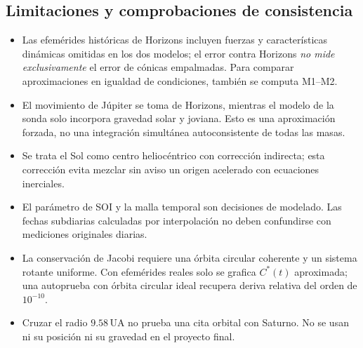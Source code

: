 \documentclass[11pt,a4paper]{article}
\begin{document}
\subsection{Limitaciones y comprobaciones de consistencia}
\begin{itemize}
\item Las efemérides históricas de Horizons incluyen fuerzas y características dinámicas omitidas en los dos modelos; el error contra Horizons \emph{no mide exclusivamente} el error de cónicas empalmadas. Para comparar aproximaciones en igualdad de condiciones, también se computa M1--M2.
\item El movimiento de Júpiter se toma de Horizons, mientras el modelo de la sonda solo incorpora gravedad solar y joviana. Esto es una aproximación forzada, no una integración simultánea autoconsistente de todas las masas.
\item Se trata el Sol como centro heliocéntrico con corrección indirecta; esta corrección evita mezclar sin aviso un origen acelerado con ecuaciones inerciales.
\item El parámetro de SOI y la malla temporal son decisiones de modelado. Las fechas subdiarias calculadas por interpolación no deben confundirse con mediciones originales diarias.
\item La conservación de Jacobi requiere una órbita circular coherente y un sistema rotante uniforme. Con efemérides reales solo se grafica $C^*(t)$ aproximada; una autoprueba con órbita circular ideal recupera deriva relativa del orden de $10^{-10}$.
\item Cruzar el radio $9.58\,\mathrm{UA}$ no prueba una cita orbital con Saturno. No se usan ni su posición ni su gravedad en el proyecto final.
\end{itemize}
\end{document}
